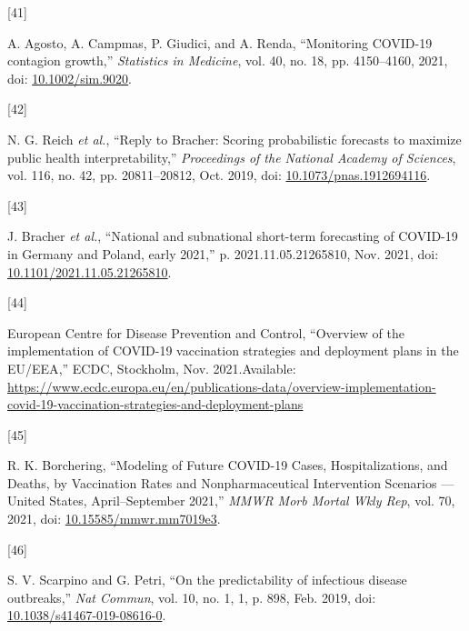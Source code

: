 \documentclass[
]{article}
\newlength{\cslhangindent}
\newlength{\csllabelwidth}
\newlength{\cslentryspacingunit} %
\newenvironment{CSLReferences}[2] %
 {%
  \setlength{\parindent}{0pt}
  \ifodd #1
  \let\oldpar\par
  \def\par{\hangindent=\cslhangindent\oldpar}
  \fi
  \setlength{\parskip}{#2\cslentryspacingunit}
 }%
 {}
\newcommand{\CSLLeftMargin}[1]{\parbox[t]{\csllabelwidth}{#1}}
\newcommand{\CSLRightInline}[1]{\parbox[t]{\linewidth - \csllabelwidth}{#1}\break}
\begin{document}
\begin{CSLReferences}{0}{0}
\leavevmode{}%
\CSLLeftMargin{{[}41{]} }
\CSLRightInline{A. Agosto, A. Campmas, P. Giudici, and A. Renda,
{``Monitoring {COVID-19} contagion growth,''} \emph{Statistics in
Medicine}, vol. 40, no. 18, pp. 4150--4160, 2021, doi:
\href{https://doi.org/10.1002/sim.9020}{10.1002/sim.9020}.}

\leavevmode{}%
\CSLLeftMargin{{[}42{]} }
\CSLRightInline{N. G. Reich \emph{et al.}, {``Reply to {Bracher}:
{Scoring} probabilistic forecasts to maximize public health
interpretability,''} \emph{Proceedings of the National Academy of
Sciences}, vol. 116, no. 42, pp. 20811--20812, Oct. 2019, doi:
\href{https://doi.org/10.1073/pnas.1912694116}{10.1073/pnas.1912694116}.}

\leavevmode{}%
\CSLLeftMargin{{[}43{]} }
\CSLRightInline{J. Bracher \emph{et al.}, {``National and subnational
short-term forecasting of {COVID-19} in {Germany} and {Poland}, early
2021,''} p. 2021.11.05.21265810, Nov. 2021, doi:
\href{https://doi.org/10.1101/2021.11.05.21265810}{10.1101/2021.11.05.21265810}.}

\leavevmode{}%
\CSLLeftMargin{{[}44{]} }
\CSLRightInline{European Centre for Disease Prevention and Control,
{``Overview of the implementation of {COVID-19} vaccination strategies
and deployment plans in the {EU}/{EEA},''} {ECDC}, {Stockholm}, Nov.
2021.Available:
\url{https://www.ecdc.europa.eu/en/publications-data/overview-implementation-covid-19-vaccination-strategies-and-deployment-plans}}

\leavevmode{}%
\CSLLeftMargin{{[}45{]} }
\CSLRightInline{R. K. Borchering, {``Modeling of {Future COVID-19
Cases}, {Hospitalizations}, and {Deaths}, by {Vaccination Rates} and
{Nonpharmaceutical Intervention Scenarios} --- {United States},
{April}--{September} 2021,''} \emph{MMWR Morb Mortal Wkly Rep}, vol. 70,
2021, doi:
\href{https://doi.org/10.15585/mmwr.mm7019e3}{10.15585/mmwr.mm7019e3}.}

\leavevmode{}%
\CSLLeftMargin{{[}46{]} }
\CSLRightInline{S. V. Scarpino and G. Petri, {``On the predictability of
infectious disease outbreaks,''} \emph{Nat Commun}, vol. 10, no. 1, 1,
p. 898, Feb. 2019, doi:
\href{https://doi.org/10.1038/s41467-019-08616-0}{10.1038/s41467-019-08616-0}.}


\end{CSLReferences}
\end{document}
